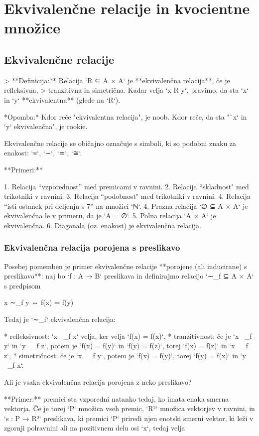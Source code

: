\chapter{Ekvivalenčne relacije in kvocientne množice}

\section{Ekvivalenčne relacije}

> **Definicija:** Relacija `R ⊆ A × A` je **ekvivalenčna relacija**, če je refleksivna,
> tranzitivna in simetrična. Kadar velja `x R y`, pravimo, da sta `x` in `y` **ekvivalentna** (glede na `R`).

*Opomba:* Kdor reče "ekvivalentna relacija", je noob. Kdor reče, da sta "`x` in `y`
ekvivalenčna", je rookie.

Ekvivalenčne relacije se običajno označuje s simboli, ki so podobni znaku za enakost:
`≡`, `∼`, `≃`, `≅`.

**Primeri:**

1. Relacija “vzporednost” med premicami v ravnini.
2. Relacija “skladnost" med trikotniki v ravnini.
3. Relacija “podobnost" med trikotniki v ravnini.
4. Relacija “isti ostanek pri deljenju s 7” na množici `ℕ`.
4. Prazna relacija `∅ ⊆ A × A` je ekvivalenčna le v primeru, da je `A = ∅`.
5. Polna relacija `A × A` je ekvivalenčna.
6. Diagonala (oz. enakost) je ekvivalenčna relacija.


\subsection{Ekvivalenčna relacija porojena s preslikavo}

Posebej pomemben je primer ekvivalenčne relacije **porojene (ali inducirane) s preslikavo**:
naj bo `f : A → B` preslikava in definirajmo relacijo `∼_f ⊆ A × A` s predpisom

    x ∼_f y ⇔ f(x) = f(y)

Tedaj je `∼_f` ekvivalenčna relacija:

* refleksivnost: `x ~_f x` velja, ker velja `f(x) = f(x)`,
* tranzitivnost: če je `x ~_f y` in `y ~_f z`, potem je `f(x) = f(y)` in `f(y) = f(z)`, torej `f(x) = f(z)` in `x ~_f z`,
* simetričnost: če je `x ~_f y`, potem je `f(x) = f(y)`, torej `f(y) = f(x)` in `y ~_f x`.

Ali je vsaka ekvivalenčna relacija porojena z neko preslikavo?

**Primer:** premici sta vzporedni natanko tedaj, ko imata enaka smerna vektorja. Če je
torej `P` množica vseh premic, `R²` množica vektorjev v ravnini, in `s : P → R²`
preslikava, ki premici `P` priredi njen enotski smerni vektor, ki leži v zgornji polravnini ali
na pozitivnem delu osi `x`, tedaj velja

